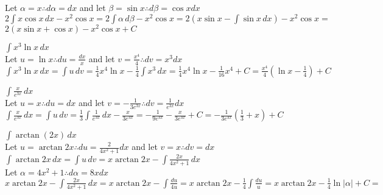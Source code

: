 \documentclass[10pt, letterpaper]{report}
\begin{document}
\begin{enumerate}
{    Let $\alpha=x\therefore d\alpha=dx$ and let $\beta=\sin{x}\therefore d\beta=\cos{x}dx$ \\

    $2\int{x\cos{x}}\,dx-x^{2}\cos{x}=2\int{\alpha}\,d\beta-x^{2}\cos{x}=
    2(x\sin{x}-\int{\sin{x}}\,dx)-x^{2}\cos{x}=$ \\

    $2(x\sin{x}+\cos{x})-x^{2}\cos{x}+C$ \\

  \item{$\int{x^{3}\ln{x}}\,dx$} \\

    Let $u=\ln{x}\therefore du=\frac{dx}{x}$ and let $v=\frac{x^{4}}{4}\therefore dv=x^{3}dx$ \\

    $\int{x^{3}\ln{x}}\,dx=\int{u}\,dv=
    \frac{1}{4}x^{4}\ln{x}-\frac{1}{4}\int{x^{3}}\,dx=
    \frac{1}{4}x^{4}\ln{x}-\frac{1}{16}x^{4}+C=
    \frac{x^{4}}{4}\left(\ln{x}-\frac{1}{4}\right)+C$ \\

  \item{$\int{\frac{x}{e^{3x}}}\,dx$} \\

    Let $u=x\therefore du=dx$ and let $v=-\frac{1}{3e^{3x}}\therefore dv=\frac{1}{e^{3x}}dx$ \\

    $\int{\frac{x}{e^{3x}}}\,dx=\int{u}\,dv=
    \frac{1}{3}\int{\frac{1}{e^{3x}}}\,dx-\frac{x}{3e^{3x}}=
    -\frac{1}{9e^{3x}}-\frac{x}{3e^{3x}}+C=
    -\frac{1}{3e^{3x}}\left(\frac{1}{3}+x\right)+C$

    \pagebreak
  \item{$\int{\arctan{(2x)}}\,dx$} \\

    Let $u=\arctan{2x}\therefore du=\frac{2}{4x^{2}+1}dx$ and let $v=x\therefore dv=dx$ \\

    $\int{\arctan{2x}}\,dx=\int{u}\,dv=x\arctan{2x}-\int{\frac{2x}{4x^{2}+1}}\,dx$ \\

    Let $\alpha=4x^{2}+1\therefore d\alpha=8xdx$ \\

    $x\arctan{2x}-\int{\frac{2x}{4x^{2}+1}}\,dx=
    x\arctan{2x}-\int{\frac{du}{4u}}=
    x\arctan{2x}-\frac{1}{4}\int{\frac{du}{u}}=
    x\arctan{2x}-\frac{1}{4}\ln{|\alpha|}+C=$ \\

}
\end{enumerate}
\end{document}
